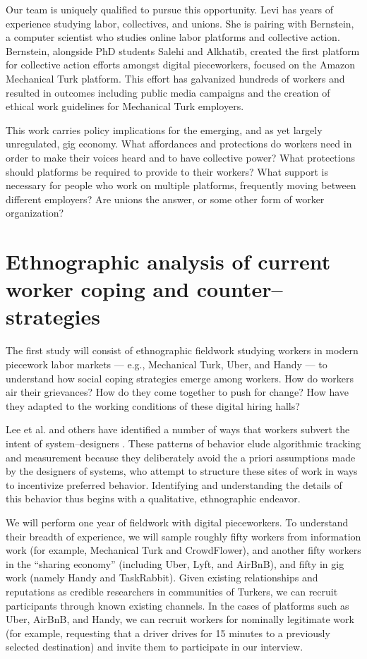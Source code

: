 \documentclass[11pt]{article}
\begin{document}
Our team is uniquely qualified to pursue this opportunity.
Levi has years of experience studying labor, collectives, and unions.
She is pairing with Bernstein, a computer scientist who studies online labor platforms and collective action.
Bernstein, alongside PhD students Salehi and Alkhatib, created the first platform for collective action efforts amongst digital pieceworkers, focused on the Amazon Mechanical Turk platform.
This effort has galvanized hundreds of workers and resulted in outcomes including public media campaigns and the creation of ethical work guidelines for Mechanical Turk employers.

This work carries policy implications for the emerging, and as yet largely unregulated, gig economy.
What affordances and protections do workers need in order to make their voices heard and to have collective power?
What protections should platforms be required to provide to their workers?
What support is necessary for people who work on multiple platforms, frequently moving between different employers?
Are unions the answer, or some other form of worker organization?


\section{Ethnographic analysis of current worker coping and counter--strategies}
The first study will consist of ethnographic fieldwork studying workers in modern piecework labor markets 
--- e.g., Mechanical Turk, Uber, and Handy ---
to understand how social coping strategies emerge among workers.
How do workers air their grievances?
How do they come together to push for change?
How have they adapted to the working conditions of these digital hiring halls?

Lee et al.
and others have identified a number of ways that workers subvert the intent of system--designers
\cite{uberAlgorithm}.
These patterns of behavior elude algorithmic tracking and measurement because they deliberately avoid the a priori assumptions made by the designers of systems,
who attempt to structure these sites of work in ways to incentivize preferred behavior.
Identifying and understanding the details of this behavior thus begins with a qualitative,
ethnographic endeavor.

We will perform one year of fieldwork with digital pieceworkers.
To understand their breadth of experience,
we will sample roughly fifty workers from information work
(for example,
Mechanical Turk and CrowdFlower),
and another fifty workers in the ``sharing economy''
(including Uber,
Lyft,
and AirBnB),
and fifty in gig work
(namely Handy and TaskRabbit).
Given existing relationships and reputations as credible researchers in communities of Turkers,
we can recruit participants through known existing channels.
In the cases of platforms such as Uber,
AirBnB,
and Handy,
we can recruit workers for nominally legitimate work
(for example,
requesting that a driver drives for 15 minutes to a previously selected destination)
and invite them to participate in our interview.
\end{document}
